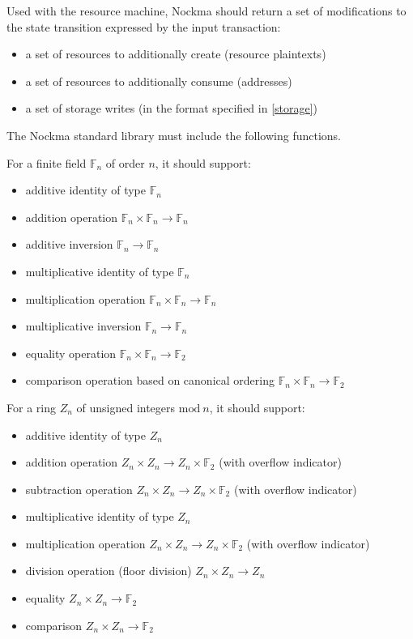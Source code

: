 Used with the resource machine, Nockma should return a set of modifications to the state transition expressed by the input transaction:

\begin{itemize}
    \item a set of resources to additionally create (resource plaintexts)
    \item a set of resources to additionally consume (addresses)
    \item a set of storage writes (in the format specified in \ref{storage})
\end{itemize}

The Nockma standard library must include the following functions.

For a finite field $\mathbb{F}_n$ of order $n$, it should support:
\begin{itemize}
    \item additive identity of type $\mathbb{F}_n$
    \item addition operation $\mathbb{F}_n \times \mathbb{F}_n \rightarrow \mathbb{F}_n$
    \item additive inversion $\mathbb{F}_n \rightarrow \mathbb{F}_n$
    \item multiplicative identity of type $\mathbb{F}_n$
    \item multiplication operation $\mathbb{F}_n \times \mathbb{F}_n \rightarrow \mathbb{F}_n$
    \item multiplicative inversion $\mathbb{F}_n \rightarrow \mathbb{F}_n$
    \item equality operation $\mathbb{F}_n \times \mathbb{F}_n \rightarrow \mathbb{F}_2$
    \item comparison operation based on canonical ordering $\mathbb{F}_n \times \mathbb{F}_n \rightarrow \mathbb{F}_2$
\end{itemize}

For a ring $Z_n$ of unsigned integers $\mathrm{mod}~n$, it should support:
\begin{itemize}
    \item additive identity of type $Z_n$
    \item addition operation $Z_n \times Z_n \rightarrow Z_n \times \mathbb{F}_2$ (with overflow indicator)
    \item subtraction operation $Z_n \times Z_n \rightarrow Z_n \times \mathbb{F}_2$ (with overflow indicator)
    \item multiplicative identity of type $Z_n$
    \item multiplication operation $Z_n \times Z_n \rightarrow Z_n \times \mathbb{F}_2$ (with overflow indicator)
    \item division operation (floor division) $Z_n \times Z_n \rightarrow Z_n$
    \item equality $Z_n \times Z_n \rightarrow \mathbb{F}_2$
    \item comparison $Z_n \times Z_n \rightarrow \mathbb{F}_2$
\end{itemize}

